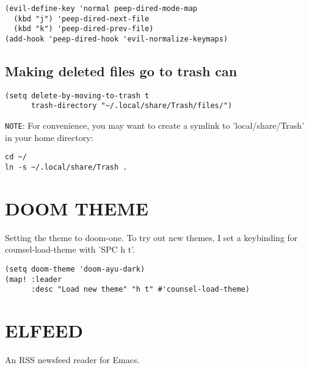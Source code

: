 \documentclass[11pt]{article}
\begin{document}
\begin{verbatim}
(evil-define-key 'normal peep-dired-mode-map
  (kbd "j") 'peep-dired-next-file
  (kbd "k") 'peep-dired-prev-file)
(add-hook 'peep-dired-hook 'evil-normalize-keymaps)
\end{verbatim}

\subsection{Making deleted files go to trash can}
\label{sec:orgd29081c}
\begin{verbatim}
(setq delete-by-moving-to-trash t
      trash-directory "~/.local/share/Trash/files/")
\end{verbatim}

\texttt{NOTE}: For convenience, you may want to create a symlink to 'local/share/Trash' in your home directory:
\begin{verbatim}
cd ~/
ln -s ~/.local/share/Trash .
\end{verbatim}


\section{DOOM THEME}
\label{sec:org2b8aec4}
Setting the theme to doom-one.  To try out new themes, I set a keybinding for counsel-load-theme with 'SPC h t'.

\begin{verbatim}
(setq doom-theme 'doom-ayu-dark)
(map! :leader
      :desc "Load new theme" "h t" #'counsel-load-theme)
\end{verbatim}

\section{ELFEED}
\label{sec:org6760b05}
An RSS newsfeed reader for Emacs.
\end{document}
